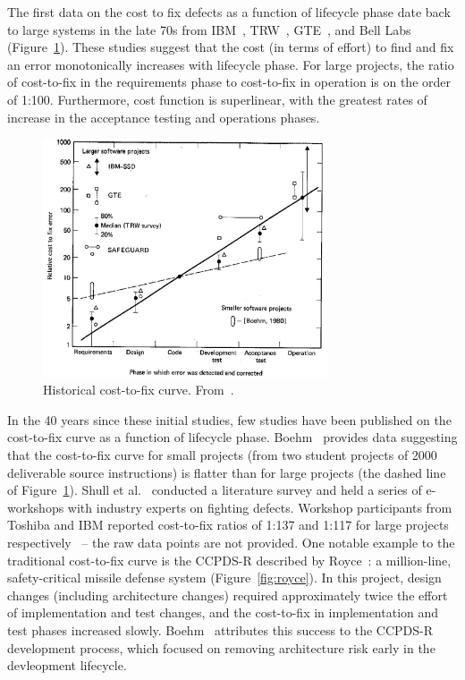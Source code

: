 
The first data on the cost to fix defects as a function of lifecycle phase date back to large systems in the late 70s from IBM~\cite{Fagan76}, TRW~\cite{Boehm76}, GTE~\cite{Daly77}, and Bell Labs~\cite{Stephenson76} (Figure~\ref{fig:cost-to-fix}). These studies suggest that the cost (in terms of effort) to find and fix an error monotonically increases with lifecycle phase. For large projects, the ratio of cost-to-fix in the requirements phase to cost-to-fix in operation is on the order of 1:100. Furthermore, cost function is superlinear, with the greatest rates of increase in the acceptance testing and operations phases.

\begin{figure}[!h]
 \includegraphics[width=3.3in]{boehm_cost-to-fix.png}
 \caption{Historical cost-to-fix curve. From~\cite{Boehm81}.}\label{fig:cost-to-fix}
 \end{figure}
 
In the 40 years since these initial studies, few studies have been published on the cost-to-fix curve as a function of lifecycle phase. Boehm~\cite{Boehm80} provides data suggesting that the cost-to-fix curve for small projects (from two student projects of 2000 deliverable source instructions) is flatter than for large projects (the dashed line of Figure~\ref{fig:cost-to-fix}). Shull et al.~\cite{Shull02} conducted a literature survey and held a series of e-workshops with industry experts on fighting defects. Workshop participants from Toshiba and IBM reported cost-to-fix ratios of 1:137 and 1:117 for large projects respectively~\cite{Shull02} -- the raw data points are not provided. One notable example to the traditional cost-to-fix curve is the CCPDS-R described by Royce~\cite{Royce98}: a million-line, safety-critical missile defense system (Figure~\ref{fig:royce}). In this project, design changes (including architecture changes) required approximately twice the effort of implementation and test changes, and the cost-to-fix in implementation and test phases increased slowly. Boehm~\cite{Boehm10} attributes this success to the CCPDS-R development process, which focused on removing architecture risk early in the devleopment lifecycle.

